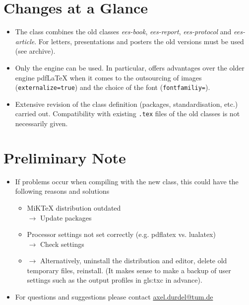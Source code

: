 \cleardoublepage
\section*{Changes at a Glance}
\begin{itemize}
	\item The class \classfile combines the old classes \textit{ees-book}, \textit{ees-report}, \textit{ees-protocol} and \textit{ees-article}. For letters, presentations and posters the old versions must be used (see archive).
	\item Only the engine {\LuaLaTeX} can be used. In particular, {\LuaLaTeX} offers advantages over the older engine {pdf\LaTeX} when it comes to the outsourcing of images (\texttt{externalize=true}) and the choice of the font (\texttt{fontfamiliy=}).
	\item Extensive revision of the class definition (packages, standardisation, etc.) carried out. Compatibility with existing \texttt{.tex} files of the old classes is not necessarily given.
\end{itemize}


\section*{Preliminary Note}
\begin{itemize}
	\item If problems occur when compiling with the new class, this could have the following reasons and solutions
	\begin{itemize}
		\item MiKTeX distribution outdated \\ \quad $\rightarrow$ Update packages 
		\item Processor settings not set correctly (e.g. pdflatex vs. lualatex) \\ \quad $\rightarrow$ Check settings
		\item $\rightarrow$ Alternatively, uninstall the distribution and editor, delete old temporary files, reinstall. (It makes sense to make a backup of user settings such as the output profiles in \gls*{gls:txc} in advance).
	\end{itemize}
	\item For questions and suggestions please contact \href{mailto:axel.durdel@tum.de}{axel.durdel@tum.de}
\end{itemize}